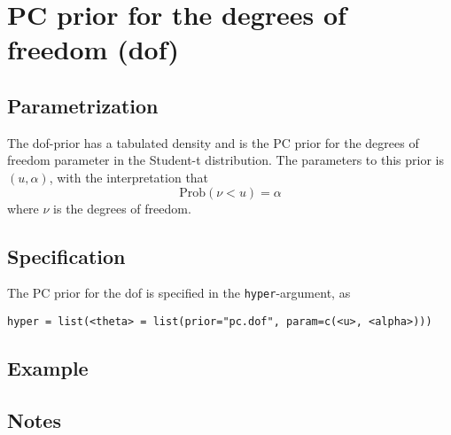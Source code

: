 \documentclass[a4paper,11pt]{article}
\begin{document}
\section*{PC prior for the degrees of freedom (dof)}

\subsection*{Parametrization}

The dof-prior has a tabulated density and is the PC prior for the
degrees of freedom parameter in the Student-t distribution.  The
parameters to this prior is $(u, \alpha{})$, with the interpretation
that
\begin{displaymath}
    \text{Prob}(\nu < u) = \alpha
\end{displaymath}
where $\nu$ is the degrees of freedom.

\subsection*{Specification}
The PC prior for the dof is specified in the \texttt{hyper}-argument, as
\begin{center}
    \texttt{hyper = list(<theta> = list(prior="pc.dof", param=c(<u>, <alpha>)))}
\end{center}

\subsection*{Example}

\subsection*{Notes}
\end{document}
